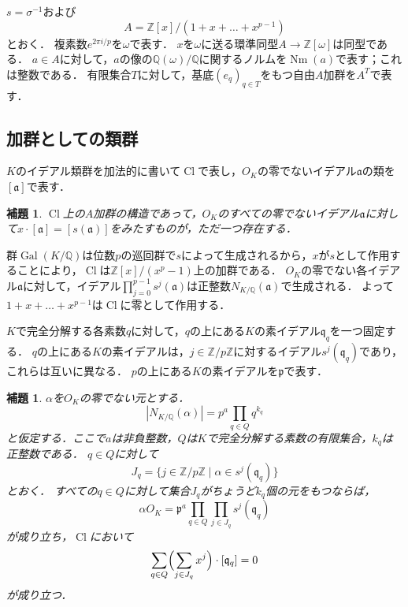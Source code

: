 \documentclass[11pt,a4paper]{ltjsarticle}
\makeatletter
\theoremstyle{ja}
\newtheorem{lemma}[theorem]{補題}
\renewenvironment{proof}[1][証明]{\par
  \pushQED{\qed}\normalfont \topsep6\p@\@plus6\p@\relax
  \trivlist
  \item[\hskip\labelsep\bfseries #1]\hspace{1\zw}\ignorespaces
}{\popQED\endtrivlist\@endpefalse}
\makeatother
\begin{document}
$s = \sigma^{-1}$および
\[
A = \mathbb{Z}[x]/(1 + x + \dots + x^{p-1})
\]
とおく．
複素数$e^{2\pi i/p}$を$\omega$で表す．
$x$を$\omega$に送る環準同型$A \to \mathbb{Z}[\omega]$は同型である．
$a \in A$に対して，$a$の像の$\mathbb{Q}(\omega)/\mathbb{Q}$に関するノルムを$\operatorname{Nm}(a)$で表す；これは整数である．
有限集合$T$に対して，基底$(e_q)_{q \in T}$をもつ自由$A$加群を$A^T$で表す．

\subsection{加群としての類群}

$K$のイデアル類群を加法的に書いて$\operatorname{Cl}$で表し，$O_K$の零でないイデアル$\mathfrak{a}$の類を$[\mathfrak{a}]$で表す．

\begin{lemma} \label{lem:module}
$\operatorname{Cl}$上の$A$加群の構造であって，$O_K$のすべての零でないイデアル$\mathfrak{a}$に対して$x \cdot [\mathfrak{a}] = [s(\mathfrak{a})]$をみたすものが，ただ一つ存在する．
\end{lemma}

\begin{proof}
群$\operatorname{Gal}(K/\mathbb{Q})$は位数$p$の巡回群で$s$によって生成されるから，$x$が$s$として作用することにより，$\operatorname{Cl}$は$\mathbb{Z}[x]/(x^p - 1)$上の加群である．
$O_K$の零でない各イデアル$\mathfrak{a}$に対して，イデアル$\prod_{j=0}^{p-1} s^j(\mathfrak{a})$は正整数$N_{K/\mathbb{Q}}(\mathfrak{a})$で生成される．
よって$1 + x + \dots + x^{p-1}$は$\operatorname{Cl}$に零として作用する．
\end{proof}

$K$で完全分解する各素数$q$に対して，$q$の上にある$K$の素イデアル$\mathfrak{q}_q$を一つ固定する．
$q$の上にある$K$の素イデアルは，$j \in \mathbb{Z}/p\mathbb{Z}$に対するイデアル$s^j(\mathfrak{q}_q)$であり，これらは互いに異なる．
$p$の上にある$K$の素イデアルを$\mathfrak{p}$で表す．

\begin{lemma} \label{lem:vector}
$\alpha$を$O_K$の零でない元とする．
\[
|N_{K/\mathbb{Q}}(\alpha)| = p^a \prod_{q \in Q} q^{k_q}
\]
と仮定する．ここで$a$は非負整数，$Q$は$K$で完全分解する素数の有限集合，$k_q$は正整数である．
$q \in Q$に対して
\[
J_q = \{ j \in \mathbb{Z}/p\mathbb{Z} \mid \alpha \in s^j(\mathfrak{q}_q) \}
\]
とおく．
すべての$q \in Q$に対して集合$J_q$がちょうど$k_q$個の元をもつならば，
\[
\alpha O_K = \mathfrak{p}^a \prod_{q \in Q} \prod_{j \in J_q} s^j(\mathfrak{q}_q)
\]
が成り立ち，$\operatorname{Cl}$において
\[
\sum_{q \in Q} \Bigl( \sum_{j \in J_q} x^j \Bigr) \cdot [\mathfrak{q}_q] = 0
\]
が成り立つ．
\end{lemma}
\end{document}
